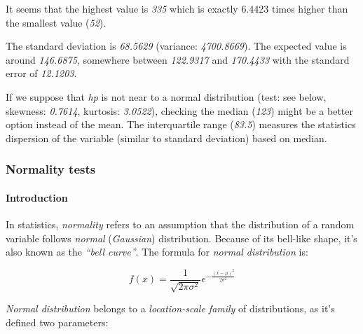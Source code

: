 \documentclass[]{article}
\begin{document}
It seems that the highest value is \emph{335} which is exactly 6.4423
times higher than the smallest value (\emph{52}).

The standard deviation is \emph{68.5629} (variance: \emph{4700.8669}).
The expected value is around \emph{146.6875}, somewhere between
\emph{122.9317} and \emph{170.4433} with the standard error of
\emph{12.1203}.

If we suppose that \emph{hp} is not near to a normal distribution (test:
see below, skewness: \emph{0.7614}, kurtosis: \emph{3.0522}), checking
the median (\emph{123}) might be a better option instead of the mean.
The interquartile range (\emph{83.5}) measures the statistics dispersion
of the variable (similar to standard deviation) based on median.

\subsubsection{Normality tests}

\paragraph{Introduction}

In statistics, \emph{normality} refers to an assumption that the
distribution of a random variable follows \emph{normal}
(\emph{Gaussian}) distribution. Because of its bell-like shape, it's
also known as the \emph{``bell curve''}. The formula for \emph{normal
distribution} is:

\[f(x) = \frac{1}{\sqrt{2\pi{}\sigma{}^2}} e^{-\frac{(x-\mu{})^2}{2\sigma{}^2}}\]

\emph{Normal distribution} belongs to a \emph{location-scale family} of
distributions, as it's defined two parameters:
\end{document}
